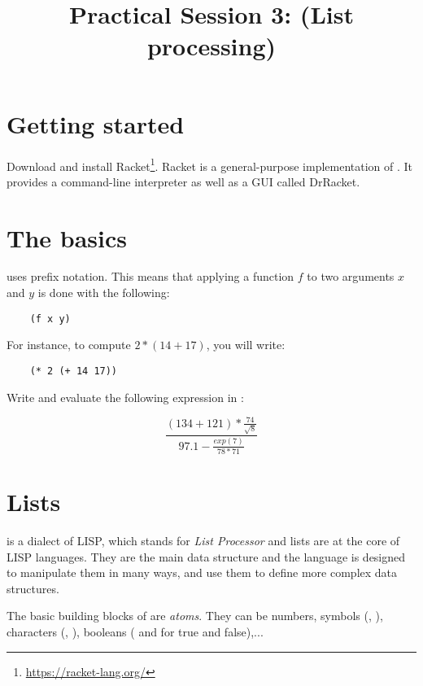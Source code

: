 \documentclass{../../../tp}
\title{Practical Session 3: \scheme (List processing)}
\author{}
\begin{document}
\maketitle

\section{Getting started}

Download and install Racket\footnote{\url{https://racket-lang.org/}}. Racket is a general-purpose implementation of \scheme. It provides a command-line interpreter as well as a GUI called DrRacket. 



\section{The basics}

\scheme uses prefix notation. This means that applying a function $f$ to two arguments $x$ and $y$ is done with the following:

\begin{verbatim}
	(f x y)
\end{verbatim}

For instance, to compute $2 * (14 + 17)$, you will write:

\begin{verbatim}
	(* 2 (+ 14 17))
\end{verbatim}


\begin{instruction}

Write and evaluate the following expression in \scheme :

$$\frac{(134 + 121) * \frac{74}{\sqrt{8}}}{ 97.1 - \frac{exp(7)}{78 * 71} } $$

\end{instruction}


\section{Lists}

\scheme is a dialect of LISP, which stands for \emph{List Processor} and lists are at the core of LISP languages. They are the main data structure and the language is designed to manipulate them in many ways, and use them to define more complex data structures.

The basic building blocks of \scheme are \emph{atoms}. They can be numbers, symbols (, ), characters (\schemecode{#\a}, \schemecode{#\Z}), booleans ( and  for true and false),... 
\end{document}

